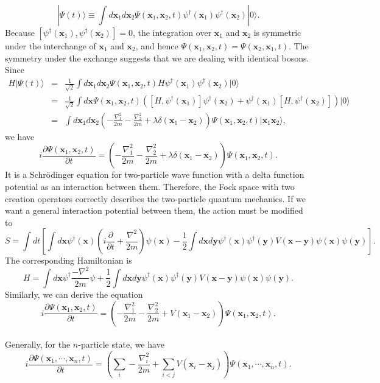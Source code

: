 \[|\Psi(t)\rangle \equiv \int d\bm{x}_1 d\bm{x}_2 \Psi(\bm{x}_1,\bm{x}_2,t)\psi^{\dagger}(\bm{x}_1)\psi^{\dagger}(\bm{x}_2)|0\rangle.\]
Because $[\psi^{\dagger}(\bm{x}_1),\psi^{\dagger}(\bm{x}_2)] = 0$, the integration over $\bm{x}_1$ and $\bm{x}_2$ is symmetric
under the interchange of $\bm{x}_1$ and $\bm{x}_2$, and hence 
$\Psi(\bm{x}_1,\bm{x}_2,t) =\Psi(\bm{x}_2,\bm{x}_1,t)$. 
The symmetry under the exchange suggests that we are dealing with identical bosons.
Since
\begin{eqnarray}
H|\Psi(t)\rangle &=& \frac{1}{\sqrt{2}} \int d\bm{x}_1 d\bm{x}_2 \Psi(\bm{x}_1,\bm{x}_2,t) H\psi^{\dagger}(\bm{x}_1)\psi^{\dagger}(\bm{x}_2)|0\rangle \nonumber \\
&=& \frac{1}{\sqrt{2}} \int d\bm{x} \Psi(\bm{x}_1,\bm{x}_2,t) ([H,\psi^{\dagger}(\bm{x}_1)]\psi^{\dagger}(\bm{x}_2) + \psi^{\dagger}(\bm{x}_1)[H,\psi^{\dagger}(\bm{x}_2)]) |0\rangle \nonumber \\
&=& \int d\bm{x}_1 d\bm{x}_2 \left( -\frac{\nabla^2_1}{2m}  -\frac{\nabla^2_2}{2m} + \lambda\delta(\bm{x}_1-\bm{x}_2)\right)\Psi(\bm{x}_1,\bm{x}_2,t) |\bm{x}_1\bm{x}_2\rangle, \nonumber
\end{eqnarray}
we have
\[i\frac{\partial \Psi(\bm{x}_1,\bm{x}_2,t)}{\partial t} = \left( -\frac{\nabla^2_1}{2m}  -\frac{\nabla^2_2}{2m} + \lambda\delta(\bm{x}_1-\bm{x}_2)\right)\Psi(\bm{x}_1,\bm{x}_2,t).\]
It is a Schr\"{o}dinger equation for two-particle wave function with a delta function potential as an interaction between them.
Therefore, the Fock space with two creation operators correctly describes the two-particle quantum mechanics.
If we want a general interaction potential between them, the action must be modified to
\[S = \int dt \left[ \int d\bm{x} \psi^{\dagger}(\bm{x})\left( i\frac{\partial }{\partial t} + \frac{\nabla^2}{2m} \right)\psi(\bm{x}) - \frac{1}{2}\int d\bm{x} d\bm{y} \psi^{\dagger}(\bm{x}) \psi^{\dagger}(\bm{y}) V(\bm{x} - \bm{y}) \psi(\bm{x})\psi(\bm{y})\right].\]
The corresponding Hamiltonian is
\[H = \int d\bm{x} \psi^{\dagger}\frac{-\nabla^2}{2m}\psi + \frac{1}{2}\int d\bm{x} d\bm{y} \psi^{\dagger}(\bm{x}) \psi^{\dagger}(\bm{y}) V(\bm{x} - \bm{y}) \psi(\bm{x})\psi(\bm{y}).\]
Similarly, we can derive the equation
\[i\frac{\partial \Psi(\bm{x}_1,\bm{x}_2,t)}{\partial t} = \left( -\frac{\nabla^2_1}{2m}  -\frac{\nabla^2_2}{2m} +  V(\bm{x}_1-\bm{x}_2)\right)\Psi(\bm{x}_1,\bm{x}_2,t).\]
\\
Generally, for the $n$-particle state, we have
\[i\frac{\partial \Psi(\bm{x}_1,\cdots,\bm{x}_n,t)}{\partial t} = \left( \sum_{i} -\frac{\nabla^2_i}{2m} +  \sum_{i < j}V(\bm{x}_i-\bm{x}_j)\right)\Psi(\bm{x}_1,\cdots,\bm{x}_n,t).\]
